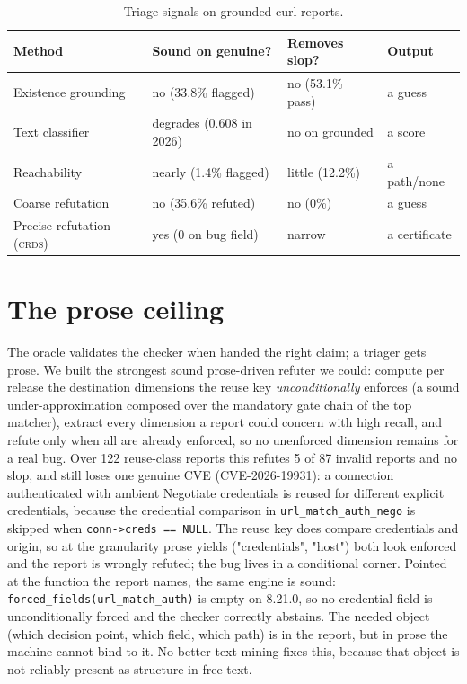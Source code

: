 \documentclass[11pt]{article}
\newcommand{\crds}{\textsc{crds}}
\begin{document}
\begin{table}[h]\centering\small
\begin{tabular}{@{}llll@{}}\toprule
Method & Sound on genuine? & Removes slop? & Output \\ \midrule
Existence grounding & no (33.8\% flagged) & no (53.1\% pass) & a guess \\
Text classifier & degrades (0.608 in 2026) & no on grounded & a score \\
Reachability & nearly (1.4\% flagged) & little (12.2\%) & a path/none \\
Coarse refutation & no (35.6\% refuted) & no (0\%) & a guess \\
Precise refutation (\crds{}) & yes (0 on bug field) & narrow & a certificate \\ \bottomrule
\end{tabular}
\caption{Triage signals on grounded curl reports.}\end{table}

\section{The prose ceiling}
The oracle validates the checker when handed the right claim; a triager gets prose. We built the strongest sound
prose-driven refuter we could: compute per release the destination dimensions the reuse key \emph{unconditionally}
enforces (a sound under-approximation composed over the mandatory gate chain of the top matcher), extract every
dimension a report could concern with high recall, and refute only when all are already enforced, so no unenforced
dimension remains for a real bug. Over 122 reuse-class reports this refutes 5 of 87 invalid reports and no slop, and
still loses one genuine CVE (CVE-2026-19931): a connection authenticated with ambient Negotiate credentials is reused
for different explicit credentials, because the credential comparison in \texttt{url\_match\_auth\_nego} is skipped
when \texttt{conn->creds == NULL}. The reuse key does compare credentials and origin, so at the granularity prose
yields ("credentials", "host") both look enforced and the report is wrongly refuted; the bug lives in a conditional
corner. Pointed at the function the report names, the same engine is sound: \texttt{forced\_fields(url\_match\_auth)}
is empty on 8.21.0, so no credential field is unconditionally forced and the checker correctly abstains. The needed
object (which decision point, which field, which path) is in the report, but in prose the machine cannot bind to it.
No better text mining fixes this, because that object is not reliably present as structure in free text.
\end{document}
